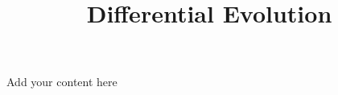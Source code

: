 \title{Differential Evolution}
\label{chp:differential-evolution}
\author{}
\institute{}
\maketitle


Add your content here




